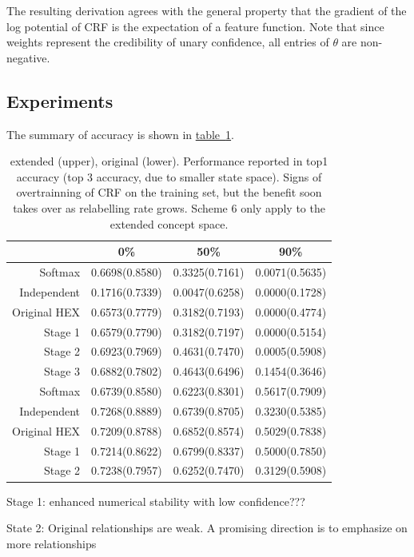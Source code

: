 \documentclass[11pt,a4paper]{article}
\begin{document}
The resulting derivation agrees with the general property that the gradient of the log potential of CRF is the expectation of a feature function. Note that since weights represent the credibility of unary confidence, all entries of $\theta$ are non-negative.

\subsection{Experiments}
\label{sec:exp2}

The summary of accuracy is shown in \hyperref[tab:summary]{table~\ref{tab:summary}}.

\begin{table}[htbp]
\centering
\begin{tabular}{r|c|c|c}
 & 0\% & 50\% & 90\%\\
\hline
Softmax & 0.6698(0.8580) & 0.3325(0.7161) & 0.0071(0.5635)\\
Independent & 0.1716(0.7339) & 0.0047(0.6258) & 0.0000(0.1728)\\
Original HEX & 0.6573(0.7779) & 0.3182(0.7193) & 0.0000(0.4774)\\
Stage 1 & 0.6579(0.7790) & 0.3182(0.7197) & 0.0000(0.5154)\\
Stage 2 & 0.6923(0.7969) & 0.4631(0.7470) & 0.0005(0.5908)\\
Stage 3 & 0.6882(0.7802) & 0.4643(0.6496) & 0.1454(0.3646)\\
\hline
Softmax & 0.6739(0.8580) & 0.6223(0.8301) & 0.5617(0.7909)\\
Independent & 0.7268(0.8889) & 0.6739(0.8705) & 0.3230(0.5385)\\
Original HEX & 0.7209(0.8788) & 0.6852(0.8574) & 0.5029(0.7838)\\
Stage 1 & 0.7214(0.8622) & 0.6799(0.8337) & 0.5000(0.7850)\\
Stage 2 & 0.7238(0.7957) & 0.6252(0.7470) & 0.3129(0.5908)
\end{tabular}
\caption{extended (upper), original (lower). Performance reported in top1 accuracy (top 3 accuracy, due to smaller state space). Signs of overtrainning of CRF on the training set, but the benefit soon takes over as relabelling rate grows. Scheme 6 only apply to the extended concept space.}
\label{tab:summary}
\end{table}

Stage 1: enhanced numerical stability with low confidence???

State 2: Original relationships are weak. A promising direction is to emphasize on more relationships
\end{document}
